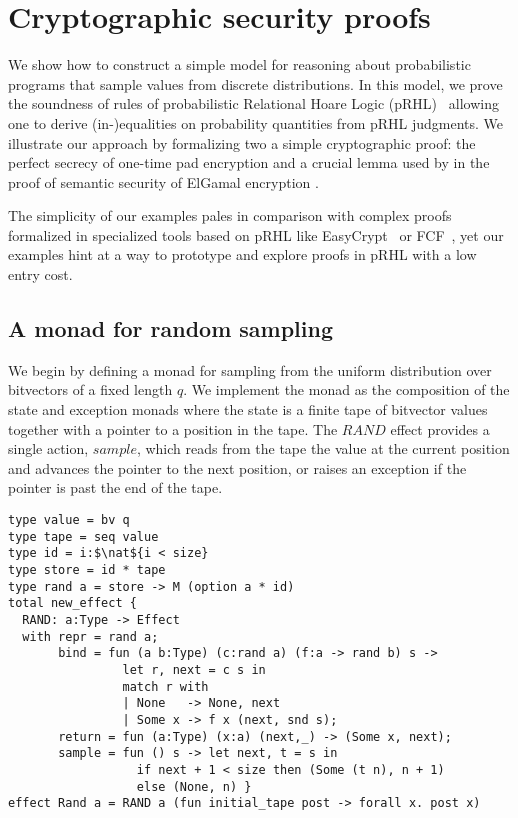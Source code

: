 \documentclass[sigplan,screen]{acmart}\settopmatter{}
\newcommand{\nat}{\mathbb{N}}
\begin{document}
\section{Cryptographic security proofs}
\label{sec:crypto}

We show how to construct a simple model for reasoning about
probabilistic programs that sample values from discrete
distributions. In this model, we prove the soundness of rules of
probabilistic Relational Hoare Logic (pRHL)~\citep{BartheGB09}
allowing one to derive (in-)equalities on probability quantities from
pRHL judgments. We illustrate our approach by formalizing \iffull two \else a \fi  simple
cryptographic proof\fi: the perfect secrecy of one-time pad encryption
\iffull and a crucial lemma used by \citet{BartheGB09}
in the proof of semantic security of ElGamal encryption \fi .

The simplicity of our examples pales in comparison with complex proofs
formalized in specialized tools based on pRHL like
EasyCrypt~\citep{BartheGB12} or FCF~\citep{PetcherM15}, yet our
examples hint at a way to prototype and explore proofs in pRHL with a
low entry cost.

\subsection{A monad for random sampling}

We begin by defining a monad for sampling from the uniform
distribution over bitvectors of a fixed length \ls$q$. We implement
the monad as the composition of the state and exception monads where the
state is a finite tape of bitvector values together with a pointer to
a position in the tape.
%
The \ls$RAND$ effect provides a single action, \ls$sample$, which
reads from the tape the value at the current position and advances the
pointer to the next position, or raises an exception if the pointer is
past the end of the tape.
%
\begin{lstlisting}
type value = bv q
type tape = seq value
type id = i:$\nat${i < size}
type store = id * tape
type rand a = store -> M (option a * id)
total new_effect {
  RAND: a:Type -> Effect
  with repr = rand a;
       bind = fun (a b:Type) (c:rand a) (f:a -> rand b) s ->
                let r, next = c s in
                match r with
                | None   -> None, next
                | Some x -> f x (next, snd s);
       return = fun (a:Type) (x:a) (next,_) -> (Some x, next);
       sample = fun () s -> let next, t = s in
                  if next + 1 < size then (Some (t n), n + 1) 
                  else (None, n) }
effect Rand a = RAND a (fun initial_tape post -> forall x. post x)
\end{lstlisting}
\end{document}

